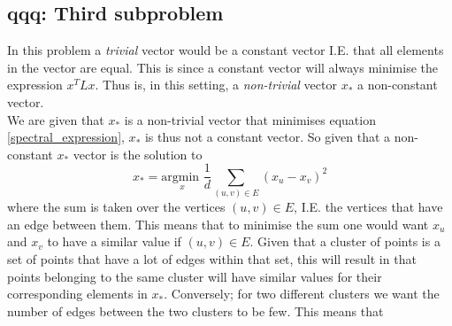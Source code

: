 \subsection*{qqq: Third subproblem}
In this problem a \textit{trivial} vector would be a constant vector I.E. that all elements in the vector are equal. This is since a constant vector will always minimise the expression $x^T L x$. Thus is, in this setting, a \textit{non-trivial} vector $x_*$ a non-constant vector. \\

We are given that $x_*$ is a non-trivial vector that minimises equation \eqref{spectral_expression}, $x_*$ is thus not a constant vector. So given that a non-constant $x_*$ vector is the solution to
\begin{equation}
  x_* = \underset{x}{\text{argmin }} \frac{1}{d} \sum_{(u, v) \in E}\left(x_{u}-x_{v}\right)^{2}
\end{equation}
where the sum is taken over the vertices $(u, v) \in E$, I.E. the vertices that have an edge between them. This means that to minimise the sum one would want $x_u$ and $x_v$ to have a similar value if $(u, v) \in E$. Given that a cluster of points is a set of points that have a lot of edges within that set, this will result in that points belonging to the same cluster will have similar values for their corresponding elements in $x_*$. Conversely; for two different clusters we want the number of edges between the two clusters to be few. This means that 
